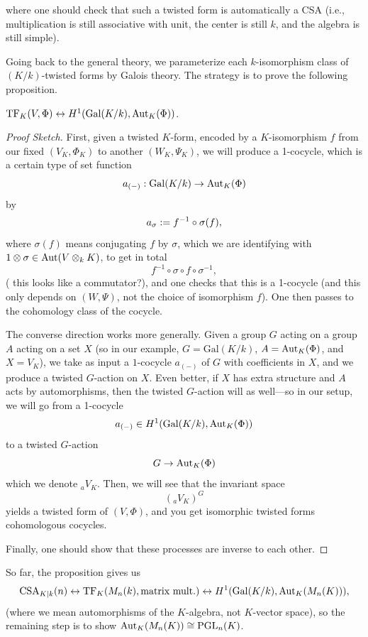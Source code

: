 \documentclass[12pt]{article}
\newcommand{\Gal}{\mathrm{Gal}}
\newcommand{\PGL}{\mathrm{PGL}}
\begin{document}
where one should check that such a twisted form is automatically a CSA (i.e., multiplication is still associative with unit, the center is still $k$, and the algebra is still simple).

Going back to the general theory, we parameterize each $k$-isomorphism class of $(K/k)$-twisted forms by Galois theory. The strategy is to prove the following proposition.
\begin{prop}
    $\mathrm{TF}_K(V,\Phi) \leftrightarrow H^1(\Gal(K/k),\Aut_K(\Phi))$.
\end{prop}
\begin{proof}[Proof Sketch]
First, given a twisted $K$-form, encoded by a $K$-isomorphism $f$ from our fixed $(V_K,\Phi_K)$ to another $(W_K,\Psi_K)$, we will produce a 1-cocycle, which is a certain type of set function
\[a_{(-)}: \Gal(K/k) \to \Aut_K(\Phi)\]
by
\[a_\sigma := f^{-1} \circ \sigma(f),\]
where $\sigma(f)$ means conjugating $f$ by $\sigma$, which we are identifying with $1\otimes \sigma \in \mathrm{Aut}(V\otimes_k K)$, to get in total
\[f^{-1} \circ \sigma \circ f \circ \sigma^{-1},\]
({\color{red} this looks like a commutator?}), and one checks that this is a 1-cocycle (and this only depends on $(W,\Psi)$, not the choice of isomorphism $f$). One then passes to the cohomology class of the cocycle.

The converse direction works more generally. Given a group $G$ acting on a group $A$ acting on a set $X$ (so in our example, $G=\Gal(K/k)$, $A=\mathrm{Aut}_K(\Phi)$, and $X=V_K$), we take as input a $1$-cocycle $a_{(-)}$ of $G$ with coefficients in $X$, and we produce a twisted $G$-action on $X$. Even better, if $X$ has extra structure and $A$ acts by automorphisms, then the twisted $G$-action will as well---so in our setup, we will go from a 1-cocycle
\[a_{(-)} \in H^1(\Gal(K/k),\Aut_K(\Phi))\]
to a twisted $G$-action
\[G\to \mathrm{Aut}_K(\Phi)\]
which we denote ${}_a V_K$. Then, we will see that the invariant space
\[({}_a V_K)^G\]
yields a twisted form of $(V,\Phi)$, and you get isomorphic twisted forms cohomologous cocycles.

Finally, one should show that these processes are inverse to each other.
\end{proof}

So far, the proposition gives us
\[\mathrm{CSA}_{K|k}(n) \leftrightarrow \mathrm{TF}_K(M_n(k),\text{matrix mult.}) \leftrightarrow H^1(\Gal(K/k), \Aut_K(M_n(K))),\]
(where we mean automorphisms of the $K$-algebra, not $K$-vector space), so the remaining step is to show $\Aut_K(M_n(K)) \cong \PGL_n(K)$.
\end{document}
